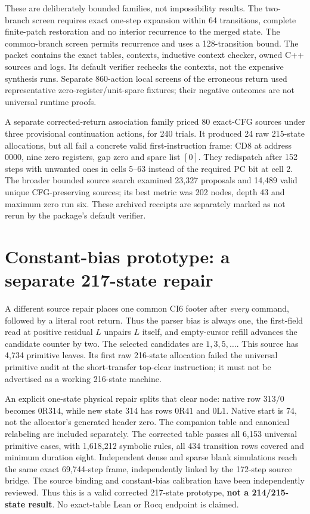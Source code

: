 \documentclass[11pt]{article}
\begin{document}
These are deliberately bounded families, not impossibility results. The two-branch screen requires exact one-step expansion within 64 transitions, complete finite-patch restoration and no interior recurrence to the merged state. The common-branch screen permits recurrence and uses a 128-transition bound. The packet contains the exact tables, contexts, inductive context checker, owned C++ sources and logs. Its default verifier rechecks the contexts, not the expensive synthesis runs. Separate 860-action local screens of the erroneous return used representative zero-register/unit-spare fixtures; their negative outcomes are not universal runtime proofs.

A separate corrected-return association family priced 80 exact-CFG sources under three provisional continuation actions, for 240 trials. It produced 24 raw 215-state allocations, but all fail a concrete valid first-instruction frame: CD8 at address 0000, nine zero registers, gap zero and spare list $[0]$. They redispatch after 152 steps with unwanted ones in cells 5--63 instead of the required PC bit at cell 2. The broader bounded source search examined 23,327 proposals and 14,489 valid unique CFG-preserving sources; its best metric was 202 nodes, depth 43 and maximum zero run six. These archived receipts are separately marked as not rerun by the package's default verifier.

\section{Constant-bias prototype: a separate 217-state repair}
A different source repair places one common $\mathrm{CI}6$ footer after \emph{every} command, followed by a literal root return. Thus the parser bias is always one, the first-field read at positive residual $L$ unpairs $L$ itself, and empty-cursor refill advances the candidate counter by two. The selected candidates are $1,3,5,\ldots$. This source has 4,734 primitive leaves. Its first raw 216-state allocation failed the universal primitive audit at the short-transfer top-clear instruction; it must not be advertised as a working 216-state machine.

An explicit one-state physical repair splits that clear node: native row $313/0$ becomes $0\mathrm{R}314$, while new state 314 has rows $0\mathrm{R}41$ and $0\mathrm{L}1$. Native start is 74, not the allocator's generated header zero. The companion table and canonical relabeling are included separately. The corrected table passes all 6,153 universal primitive cases, with 1,618,212 symbolic rules, all 434 transition rows covered and minimum duration eight. Independent dense and sparse blank simulations reach the same exact 69,744-step frame, independently linked by the 172-step source bridge. The source binding and constant-bias calibration have been independently reviewed. Thus this is a valid corrected 217-state prototype, \textbf{not a 214/215-state result}. No exact-table Lean or Rocq endpoint is claimed.
\end{document}
